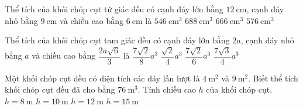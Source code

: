 \begin{ex}%
	Thể tích của khối chóp cụt tứ giác đều có cạnh đáy lớn bằng $12~\mathrm{cm}$, cạnh đáy nhỏ bằng $9~\mathrm{cm}$ và chiều cao bằng $6~\mathrm{cm}$ là
	\choice
	{$546 ~\mathrm{cm^3}$}
	{$688 ~\mathrm{cm^3}$}
	{\True $666 ~\mathrm{cm^3}$}
	{$576 ~\mathrm{cm^3}$}
\end{ex}

\begin{ex}%
	Thể tích của khối chóp cụt tam giác đều có cạnh đáy lớn bằng $2a$, cạnh đáy nhỏ bằng $a$ và chiều cao bằng $\dfrac{2a\sqrt{6}}{3}$ là
	\choice
	{$\dfrac{7\sqrt{2}}{8} a^3$}
	{$\dfrac{\sqrt{2}}{4} a^3$}
	{\True $\dfrac{7\sqrt{2}}{6} a^3$}
	{$\dfrac{7\sqrt{3}}{4} a^3$}
\end{ex}

\begin{ex}%
	Một  khối chóp cụt đều có diện tích các đáy lần lượt là $4~\mathrm{m^2}$ và $9~\mathrm{m^2}$. Biết thể tích khối chóp cụt đều đã cho bằng $76 ~\mathrm{m^3}$. Tính chiều cao $h$ của khối chóp cụt. 
	\choice
	{$h=8 ~\mathrm{m}$}
	{$h=10 ~\mathrm{m}$}
	{\True $h=12 ~\mathrm{m}$}
	{$h=15 ~\mathrm{m}$}
\end{ex}


